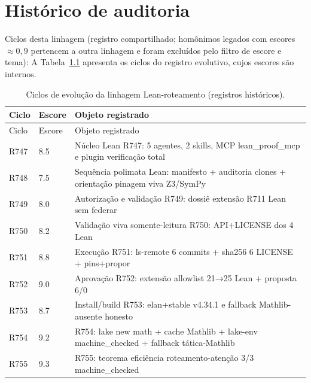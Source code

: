 \documentclass[12pt,openany,oneside,a4paper,brazil,chapter=TITLE]{abntex2}
\begin{document}
\chapter{Histórico de auditoria}
\label{ap:historico}
Ciclos desta linhagem (registro compartilhado; homônimos legados com escores $\approx0{,}9$ pertencem a outra linhagem e foram excluídos pelo filtro de escore e tema):
A Tabela~\ref{tab:historico} apresenta os ciclos do registro evolutivo, cujos escores são internos.
\begin{SingleSpacing}
\fontsize{10}{12}\selectfont

\begin{longtable}{p{1.1cm}p{1.2cm}p{12.2cm}}
\caption{Ciclos de evolução da linhagem Lean-roteamento (registros históricos).}\label{tab:historico}\\
\toprule
Ciclo & Escore & Objeto registrado \\
\midrule
\endfirsthead
\toprule
Ciclo & Escore & Objeto registrado \\
\midrule
\endhead
R747 & 8.5 & \parbox[t]{12cm}{\raggedright\footnotesize Núcleo Lean R747: 5 agentes, 2 skills, MCP lean\_proof\_mcp e plugin verificação total} \\
R748 & 7.5 & \parbox[t]{12cm}{\raggedright\footnotesize Sequência polimata Lean: manifesto + auditoria clones + orientação pinagem viva Z3/SymPy} \\
R749 & 8.0 & \parbox[t]{12cm}{\raggedright\footnotesize Autorização e validação R749: dossiê extensão R711 Lean sem federar} \\
R750 & 8.2 & \parbox[t]{12cm}{\raggedright\footnotesize Validação viva somente-leitura R750: API+LICENSE dos 4 Lean} \\
R751 & 8.8 & \parbox[t]{12cm}{\raggedright\footnotesize Execução R751: ls-remote 6 commits + sha256 6 LICENSE + pins+propor} \\
R752 & 9.0 & \parbox[t]{12cm}{\raggedright\footnotesize Aprovação R752: extensão allowlist 21→25 Lean + proposta 6/0} \\
R753 & 8.7 & \parbox[t]{12cm}{\raggedright\footnotesize Install/build R753: elan+stable v4.34.1 e fallback Mathlib-ausente honesto} \\
R754 & 9.2 & \parbox[t]{12cm}{\raggedright\footnotesize R754: lake new math + cache Mathlib + lake-env machine\_checked + fallback tática-Mathlib} \\
R755 & 9.3 & \parbox[t]{12cm}{\raggedright\footnotesize R755: teorema eficiência roteamento-atenção 3/3 machine\_checked} \\

\end{longtable}
\end{SingleSpacing}
\end{document}
